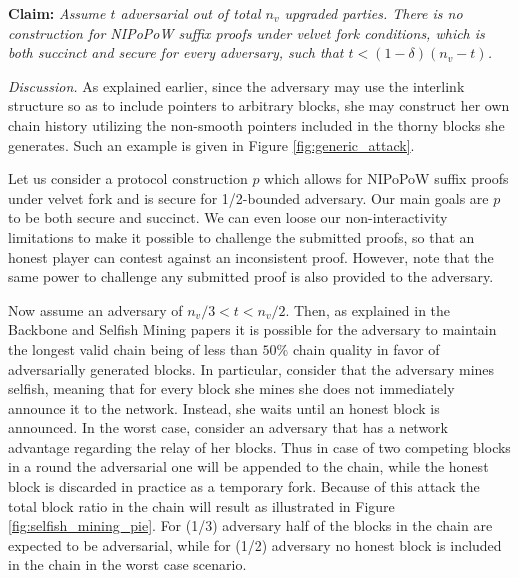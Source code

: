 \textbf{Claim:} \textit{Assume $t$ adversarial out of total $n_v$ upgraded parties.
There is no construction for NIPoPoW suffix proofs under velvet fork conditions,
which is both succinct and secure for every adversary, such that
$t < (1 - \delta)(n_v - t)$.}

\textit{Discussion.} As explained earlier, since the adversary may use the interlink
structure so as to include pointers to arbitrary blocks,  she may construct her own
chain history utilizing the non-smooth pointers included in the thorny blocks she
generates. Such an example is given in Figure \ref{fig:generic_attack}.

Let us consider a protocol construction $p$ which allows for NIPoPoW suffix proofs
under velvet fork and is secure for 1/2-bounded adversary. Our main
goals are $p$ to be both secure and succinct. We can even loose our non-interactivity
limitations to make it possible to challenge the submitted proofs, so that an honest
player can contest against an inconsistent proof. However, note that the same power
to challenge any submitted proof is also provided to the adversary.

Now assume an adversary of $ n_v/3 < t < n_v/2 $. Then, as explained
in the Backbone and Selfish Mining papers \cite{Backbone}\cite{selfish_mining} it
is possible for the adversary to maintain the longest valid chain being of less
than $50\%$ chain quality in favor of adversarially generated blocks. In particular,
consider that the adversary mines selfish, meaning that for every block she mines
she does not immediately announce it to the network. Instead, she waits until an
honest block is announced. In the worst case, consider an adversary that has a
network advantage regarding the relay of her blocks. Thus in case of two competing
blocks in a round the adversarial one will be appended to the chain, while the
honest block is discarded in practice as a temporary fork. Because of this attack
the total block ratio in the chain will result as illustrated in Figure
\ref{fig:selfish_mining_pie}. For (1/3) adversary half of the blocks in the
chain are expected to be adversarial, while for (1/2) adversary no honest block
is included in the chain in the worst case scenario.

